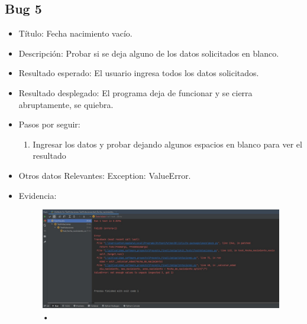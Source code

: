 \documentclass[conference]{IEEEtran}
\begin{document}
\subsection*{Bug 5}
\begin{itemize}
\item Título: Fecha nacimiento vacío.

\item Descripción: Probar si se deja alguno de los datos solicitados en blanco.

\item Resultado esperado: El usuario ingresa todos los datos solicitados.

\item Resultado desplegado: El programa deja de funcionar y se cierra abruptamente, se quiebra. 

\item Pasos por seguir: 
\begin{enumerate}
\item Ingresar los datos y probar dejando algunos espacios en blanco para ver el resultado
\end{enumerate}
\item Otros datos Relevantes: Exception: ValueError.
\item Evidencia:
\begin{figure}[H]
\centering
\includegraphics[scale=0.2]{imagenes/fecha_vacia.jpeg}
\caption{•}
\end{figure}

\end{itemize}
\end{document}

